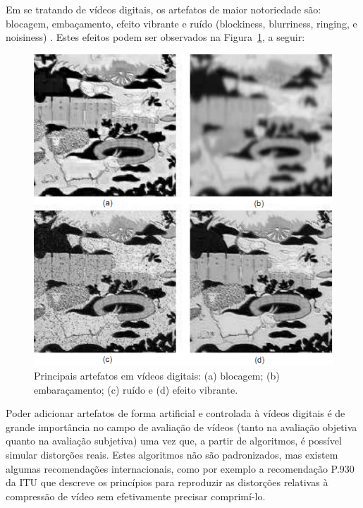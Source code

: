 Em se tratando de vídeos digitais, os artefatos de maior notoriedade são: blocagem, embaçamento, efeito vibrante e ruído (blockiness, blurriness, ringing, e noisiness) \cite{farias2007}. Estes efeitos podem ser observados na Figura~\ref{fig:artefatosdigitais}, a seguir:

\begin{figure}[!htb]
	\centering
	\includegraphics[scale=0.45]{./imgs/figura1.png}
	\caption{Principais artefatos em vídeos digitais: (a) blocagem; (b) embaraçamento; (c) ruído e (d) efeito vibrante.}
	\label{fig:artefatosdigitais}
\end{figure}


Poder adicionar artefatos de forma artificial e controlada à vídeos digitais é de grande importância no campo de avaliação de vídeos (tanto na avaliação objetiva quanto na avaliação subjetiva) uma vez que, a partir de algoritmos, é possível simular distorções reais. Estes algoritmos não são padronizados, mas existem algumas recomendações internacionais, como por exemplo a recomendação P.930 da ITU \cite{itup930} que descreve os princípios para reproduzir as distorções relativas à compressão de vídeo sem efetivamente precisar comprimí-lo.

